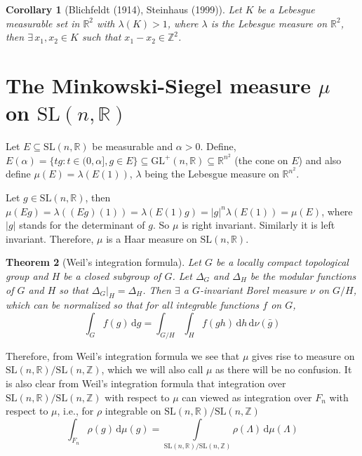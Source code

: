 \documentclass[11pt]{article}
\newtheorem{theorem}{Theorem}[section]
\newtheorem{corollary}[theorem]{Corollary}
\theoremstyle{definition}
\begin{document}
\begin{corollary}[Blichfeldt (1914), Steinhaus (1999)]\label{cor1}
    Let $K$ be a Lebesgue measurable set in $\mathbb{R}^2$ with $ \lambda (K) > 1$, where $\lambda$ is the Lebesgue measure on $\mathbb{R}^2$, then $\exists \, x_1 , x_2 \in K$ such that $x_1 - x_2 \in \mathbb{Z}^2$.
\end{corollary}

\section{The Minkowski-Siegel measure $\mu$ on $\mathrm{SL}(n,  \mathbb{R})$}
Let $E \subseteq \mathrm{SL}(n,  \mathbb{R})$ be measurable and $\alpha > 0$.
Define, $E(\alpha )= \{tg: t \in (0,\alpha ], g \in E\} \subseteq \mathrm{GL}^+(n, \mathbb{R}) \subseteq \mathbb{R}^{n^2}$ (the cone on $E$) and also define $ \mu (E) = \lambda (E(1))$, $\lambda$ being the Lebesgue measure on $\mathbb{R}^{n^2}$.

Let $g\in \mathrm{SL}(n,  \mathbb{R})$, then $\mu (Eg)= \lambda ((Eg)(1))=\lambda (E(1)g)=|g|^n \lambda (E(1))= \mu (E)$, where $|g|$ stands for the determinant of $g$.
So $\mu$ is right invariant.
Similarly it is left invariant.
Therefore, $\mu$ is a Haar measure on $\mathrm{SL}(n,\mathbb{R})$.

\begin{theorem}[Weil's integration formula]\label{thm}
    Let $G$ be a locally compact topological group and $H$ be a closed subgroup of $G$.
    Let $\Delta_G$ and $\Delta _H$ be the modular functions of $G$ and $H$ so that $\Delta _G\big|_H = \Delta _H$.
    Then $\exists$ a $G$-invariant Borel measure $\nu$ on $G/H$, which can be normalized so that for all integrable functions $f$ on $G$,
    \[
        \int_{G} f(g) \, \mathrm{d} g = \int_{G/H}\int_{H} f(gh) \, \mathrm{d} h \, \mathrm{d} \nu (\bar{g})
    \]

\end{theorem}

Therefore, from Weil's integration formula we see that $\mu$ gives rise to measure on $\mathrm{SL}(n,\mathbb{R})/\mathrm{SL}(n,\mathbb{Z})$, which we will also call $\mu$ as there will be no confusion.
It is also clear from Weil's integration formula that integration over $\mathrm{SL}(n,\mathbb{R})/\mathrm{SL}(n,\mathbb{Z})$ with respect to $\mu$ can viewed as integration over $F_n$ with respect to $\mu$, i.e., for $\rho $ integrable on $\mathrm{SL}(n,\mathbb{R})/\mathrm{SL}(n,\mathbb{Z})$
\[
    \int_{F_n} \rho (g) \, \mathrm{d} \mu (g) = \int\limits_{\mathrm{SL}(n,\mathbb{R})/\mathrm{SL}(n,\mathbb{Z})} \rho (\Lambda ) \, \mathrm{d} \mu (\Lambda )
\]
\end{document}
